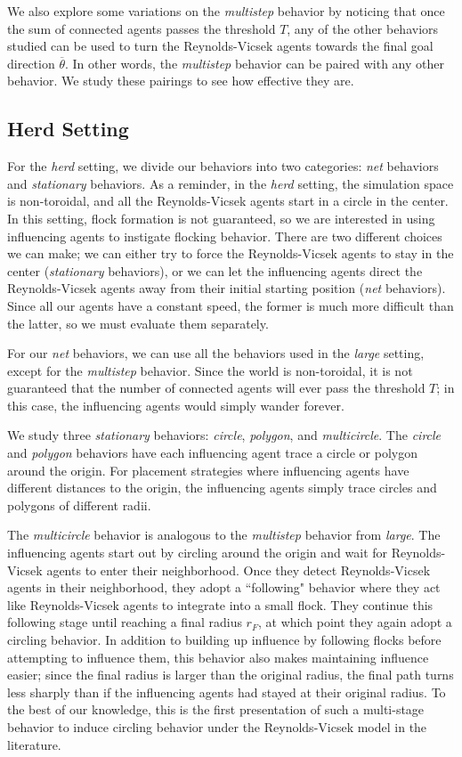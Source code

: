 We also explore some variations on the \textit{multistep} behavior by noticing
that once the sum of connected agents passes the threshold $T$, any of the
other behaviors studied can be used to turn the Reynolds-Vicsek agents towards
the final goal direction $\overline{\theta}$.
In other words, the \textit{multistep} behavior can be paired with any other
behavior.
We study these pairings to see how effective they are.

\subsection{Herd Setting}
For the \textit{herd} setting, we divide our behaviors into two categories:
\textit{net} behaviors and \textit{stationary} behaviors.
As a reminder, in the \textit{herd} setting, the simulation space is
non-toroidal, and all the Reynolds-Vicsek agents start in a circle in the
center.
In this setting, flock formation is not guaranteed, so we are interested in
using influencing agents to instigate flocking behavior.
There are two different choices we can make; we can either try to force the
Reynolds-Vicsek agents to stay in the center (\textit{stationary} behaviors),
or we can let the influencing agents direct the Reynolds-Vicsek agents away
from their initial starting position (\textit{net} behaviors).
Since all our agents have a constant speed, the former is much more difficult
than the latter, so we must evaluate them separately.

For our \textit{net} behaviors, we can use all the behaviors used in the
\textit{large} setting, except for the \textit{multistep} behavior.
Since the world is non-toroidal, it is not guaranteed that the number of
connected agents will ever pass the threshold $T$; in this case, the
influencing agents would simply wander forever.

We study three \textit{stationary} behaviors: \textit{circle}, \textit{polygon},
and \textit{multicircle}.
The \textit{circle} and \textit{polygon} behaviors have each influencing agent
trace a circle or polygon around the origin.
For placement strategies where influencing agents have different distances to
the origin, the influencing agents simply trace circles and polygons of
different radii.

The \textit{multicircle} behavior is analogous to the \textit{multistep}
behavior from \textit{large}.
The influencing agents start out by circling around the origin and wait for
Reynolds-Vicsek agents to enter their neighborhood.
Once they detect Reynolds-Vicsek agents in their neighborhood, they adopt a
``following" behavior where they act like Reynolds-Vicsek agents to integrate
into a small flock.
They continue this following stage until reaching a final radius $r_F$, at which
point they again adopt a circling behavior.
In addition to building up influence by following flocks before attempting to
influence them, this behavior also makes maintaining influence easier; since
the final radius is larger than the original radius, the final path turns less
sharply than if the influencing agents had stayed at their original radius.
To the best of our knowledge, this is the first presentation of such a
multi-stage behavior to induce circling behavior under the Reynolds-Vicsek
model in the literature.


